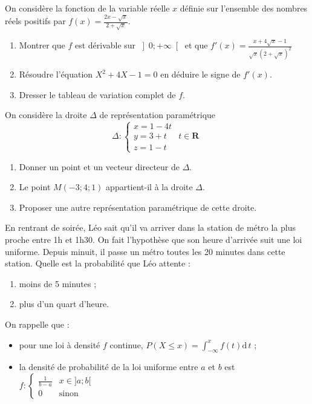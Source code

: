 \begin{question}[topic=fonction]
On considère la fonction de la variable réelle $x$ définie sur
l'ensemble des nombres réels positifs par $f(x) = \frac{2x - \sqrt{x}}{2
+ \sqrt{x}}$.

\begin{enumerate}
  \item Montrer que $f$ est dérivable sur $\left]0 ; +\infty\right[$ et
    que $f'(x) = \frac{ x + 4\sqrt{x} - 1}{\sqrt{x}(2 + \sqrt{x})^2}$
  \item Résoudre l'équation $X^2 + 4X - 1 =0$ en déduire le signe de
    $f'(x)$.
  \item Dresser le tableau de variation complet de $f$.
\end{enumerate}
\end{question}

\begin{question}[topic=géométrie]
On considère la droite $\Delta$ de représentation paramétrique \[ \Delta
  : \left\lbrace \begin{array}{lr} x = 1 - 4t & \\ y = 3 + t & t\in
\mathbf{R} \\ z = 1 - t & \end{array}\right. \]

\begin{enumerate}
  \item Donner un point et un vecteur directeur de $\Delta$.
  \item Le point $M (-3;4;1)$ appartient-il à la droite $\Delta$.
  \item Proposer une autre représentation paramétrique de cette droite.
\end{enumerate}
\end{question}

\begin{question}[topic=loi_continue]
En rentrant de soirée, Léo sait qu'il va arriver dans la station de
métro la plus proche entre 1h et 1h30. On fait l'hypothèse que son heure
d'arrivée suit une loi uniforme. Depuis minuit, il passe un métro toutes
les 20 minutes dans cette station. Quelle est la probabilité que Léo
attente :
\begin{enumerate}
  \item moins de 5 minutes ;
  \item plus d'un quart d'heure.
\end{enumerate}

On rappelle que :
\begin{itemize}
  \item pour une loi à densité $f$ continue, $P(X \leq x) =
    \int_{-\infty}^x f(t) \mathrm{d}\,t$ ;
  \item la densité de probabilité de la loi uniforme entre $a$ et $b$
    est $f : \left\lbrace \begin{array}{lr} \frac1{b-a} & x \in ]a;b[
    \\ 0 & \text{sinon}\end{array}\right.$
\end{itemize}
\end{question}

